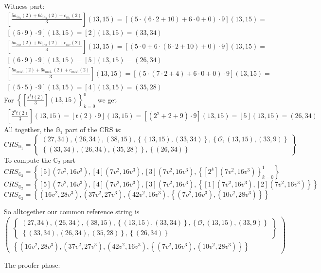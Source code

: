 \begin{example}
Witness part:
\begin{multline*}
\left[\frac{5 a_{in_1}(2)+6 b_{in_1}(2)+c_{in_1}(2)}{3}\right](13,15) = 
\left[(5\cdot (6\cdot 2 +10) +6\cdot 0 +0 )\cdot 9\right](13,15) = \\
\left[(5\cdot 9)\cdot 9\right](13,15) =
\left[2\right](13,15) = (33,34)
\end{multline*}
\begin{multline*}
\left[\frac{5 a_{in_2}(2)+6 b_{in_2}(2)+c_{in_2}(2)}{3}\right](13,15) = 
\left[(5\cdot 0 +6\cdot (6\cdot 2 + 10) + 0 )\cdot 9\right](13,15) = \\
\left[(6\cdot 9)\cdot 9\right](13,15) =
\left[5\right](13,15) =
(26,34)
\end{multline*}
\begin{multline*}
\left[\frac{5 a_{mid_1}(2)+6 b_{mid_1}(2)+c_{mid_1}(2)}{3}\right](13,15) = 
\left[(5\cdot (7\cdot 2 + 4) +6\cdot 0 + 0 )\cdot 9\right](13,15) = \\
\left[(5\cdot 5)\cdot 9\right](13,15) =
\left[4\right](13,15) =
(35,28)
\end{multline*}
For $\left\{\left[\frac{s^{k}t(2)}{3}\right](13,15)\right\} _{k=0}^{0}$ we get
\begin{multline*}
\left[\frac{2^{0}t(2)}{3}\right](13,15)=
[t(2)\cdot 9](13,15)= 
[(2^2+2+9)\cdot 9](13,15)= 
[5](13,15) =
(26,34)
\end{multline*}
All together, the $\mathbb{G}_1$ part of the CRS is:
$$
CRS_{\mathbb{G}_{1}}=\left\{ \begin{array}{c}
(27,34),(26,34),(38,15),\left\{(13,15),(33,34)\right\},
\left\{\mathcal{O}, (13,15), (33,9)\right\}\\
\left\{(33,34),(26,34),(35,28)\right\},
\left\{(26,34)\right\}
\end{array}\right\}
$$
To compute the $\mathbb{G}_2$ part 
$$
CRS_{\mathbb{G}_{2}}=\left\{ [5](7v^2,16v^3) ,[4](7v^2,16v^3),[3](7v^2,16v^3),\left\{[2^k](7v^2,16v^3)\right\} _{k=0}^{1}\right\} 
$$
$$
CRS_{\mathbb{G}_{2}}=\left\{ [5](7v^2,16v^3) ,[4](7v^2,16v^3),[3](7v^2,16v^3),\left\{[1](7v^2,16v^3), [2](7v^2,16v^3)\right\}\right\} 
$$
$$
CRS_{\mathbb{G}_{2}}=\left\{(16v^2,28v^3) ,(37v^2,27v^3),(42v^2,16v^3),\left\{(7v^2,16v^3), (10v^2,28v^3)\right\}\right\} 
$$

So alltogether our common reference string is 
$$
\begin{pmatrix}
\left\{ \begin{array}{c}
(27,34),(26,34),(38,15),\left\{(13,15),(33,34)\right\},
\left\{\mathcal{O}, (13,15), (33,9)\right\}\\
\left\{(33,34),(26,34),(35,28)\right\},
\left\{(26,34)\right\}
\end{array}\right\}\\
\left\{(16v^2,28v^3) ,(37v^2,27v^3),(42v^2,16v^3),\left\{(7v^2,16v^3), (10v^2,28v^3)\right\}\right\}
\end{pmatrix}
$$

The proofer phase: 

\end{example}

